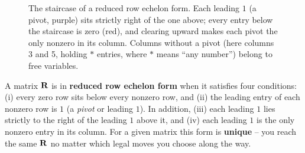 \begin{figure}[H]
\centering
{}
\caption{The staircase of a reduced row echelon form. Each leading $1$ (a pivot,
purple) sits strictly right of the one above; every entry below the staircase
is zero (red), and clearing upward makes each pivot the only nonzero in
its column. Columns without a pivot (here columns 3 and 5, holding $*$ entries,
where $*$ means ``any number'') belong to free variables.}
\label{ch07:rref-staircase}
\end{figure}

\begin{formalbox}
A matrix $\mathbf{R}$ is in \textbf{reduced row echelon form} when it satisfies four
conditions: (i) every zero row sits below every nonzero row, and (ii) the leading
entry of each nonzero row is $1$ (a \emph{pivot} or leading $1$). In addition,
(iii) each leading $1$ lies strictly to the right of the leading $1$ above it, and
(iv) each leading $1$ is the only nonzero entry in its column. For a given matrix
this form is \textbf{unique} -- you reach the same $\mathbf{R}$ no matter which legal
moves you choose along the way.
\end{formalbox}

